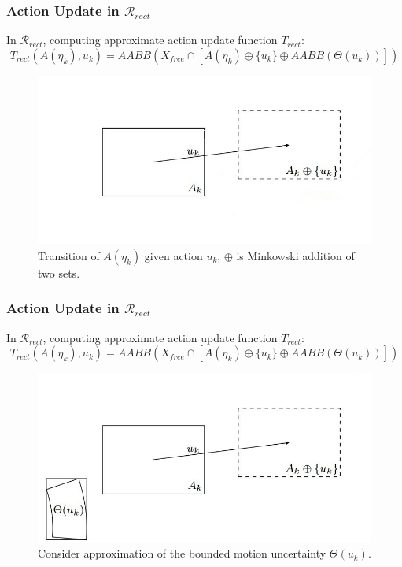 \documentclass[compress]{beamer}
\begin{document}
\begin{frame} \frametitle{Action Update in $\mathcal{R}_{rect}$}
In $\mathcal{R}_{rect}$, computing approximate action update function $T_{rect} :$\\
			$$T_{rect}(A(\eta_k), u_k) = AABB(X_{free} \cap [A(\eta_k) \oplus \{ u_k \} \oplus AABB(\Theta(u_k))])$$
    \begin{figure}
    \includegraphics[scale=0.35]{t_rect.jpg}
    \caption{Transition of $A(\eta_k)$ given action $u_k$, $\oplus$ is Minkowski addition of two sets.}
    \end{figure}
\transboxout
\end{frame}

\begin{frame} \frametitle{Action Update in $\mathcal{R}_{rect}$}
In $\mathcal{R}_{rect}$, computing approximate action update function $T_{rect} :$\\
			$$T_{rect}(A(\eta_k), u_k) = AABB(X_{free} \cap [A(\eta_k) \oplus \{ u_k \} \oplus AABB(\Theta(u_k))])$$
    \begin{figure}
    \includegraphics[scale=0.35]{t_rect2.jpg}
    \caption{Consider approximation of the bounded motion uncertainty $\Theta(u_k)$.}
    \end{figure}

\transboxout
\end{frame}
\end{document}
